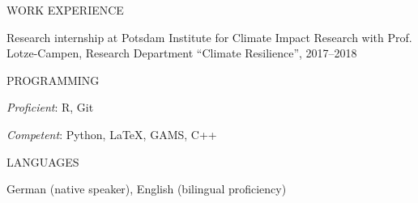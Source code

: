 \documentclass{article}
\begin{document}

\begin{minipage}[t]{0.12\textwidth}
    {\selectfont WORK EXPERIENCE} \\
\end{minipage}
\hspace{5mm}
\begin{minipage}[t]{0.8\textwidth}
    Research internship at Potsdam Institute for Climate Impact Research with Prof. Lotze-Campen, Research Department ``Climate Resilience'', 2017--2018
\end{minipage}
\medskip


\begin{minipage}[t]{0.12\textwidth}
    {\selectfont PROGRAMMING} \\
\end{minipage}
\hspace{5mm}
\begin{minipage}[t]{0.8\textwidth}
    \textit{Proficient}: R, Git \par
    \textit{Competent}: Python, LaTeX, GAMS, C++
\end{minipage}
\medskip


\begin{minipage}[t]{0.12\textwidth}
    {\selectfont LANGUAGES} \\
\end{minipage}
\hspace{5mm}
\begin{minipage}[t]{0.8\textwidth}
    German (native speaker), English (bilingual proficiency)
\end{minipage}
\medskip

\end{document}
